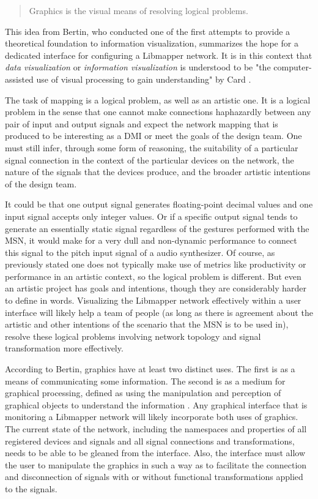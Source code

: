 \begin{quote}
Graphics is the visual means of resolving logical problems. \cite{bertin1981}
\end{quote}

This idea from Bertin, who conducted one of the first attempts to provide a theoretical foundation to information visualization, summarizes the hope for a dedicated interface for configuring a Libmapper network. It is in this context that \emph{data visualization} or \emph{information visualization} is understood to be "the computer-assisted use of visual processing to gain understanding" by Card \cite{card1997}. 

The task of mapping is a logical problem, as well as an artistic one. It is a logical problem in the sense that one cannot make connections haphazardly between any pair of input and output signals and expect the network mapping that is produced to be interesting as a DMI or meet the goals of the design team. One must still infer, through some form of reasoning, the suitability of a particular signal connection in the context of the particular devices on the network, the nature of the signals that the devices produce, and the broader artistic intentions of the design team. 

It could be that one output signal generates floating-point decimal values and one input signal accepts only integer values. Or if a specific output signal tends to generate an essentially static signal regardless of the gestures performed with the MSN, it would make for a very dull and non-dynamic performance to connect this signal to the pitch input signal of a audio synthesizer. Of course, as previously stated one does not typically make use of metrics like productivity or performance in an artistic context, so the logical problem is different. But even an artistic project has goals and intentions, though they are considerably harder to define in words. Visualizing the Libmapper network effectively within a user interface will likely help a team of people (as long as there is agreement about the artistic and other intentions of the scenario that the MSN is to be used in), resolve these logical problems involving network topology and signal transformation more effectively. 

According to Bertin, graphics have at least two distinct uses. The first is as a means of communicating some information. The second is as a medium for graphical processing, defined as using the manipulation and perception of graphical objects to understand the information \cite{card1997}. Any graphical interface that is monitoring a Libmapper network will likely incorporate both uses of graphics. The current state of the network, including the namespaces and properties of all registered devices and signals and all signal connections and transformations, needs to be able to be gleaned from the interface. Also, the interface must allow the user to manipulate the graphics in such a way as to facilitate the connection and disconnection of signals with or without functional transformations applied to the signals.


